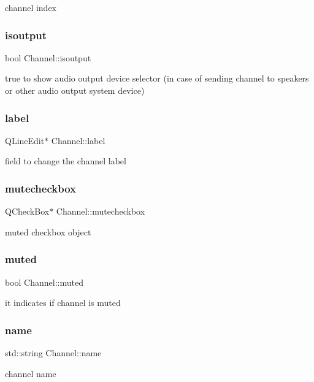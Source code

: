channel index \mbox{\label{class_channel_a01aee8d0f6f9b56328f6a061b4a5a44b}} 
\subsubsection{isoutput}
{\footnotesize\ttfamily bool Channel\+::isoutput\hspace{0.3cm}{\ttfamily [private]}}

true to show audio output device selector (in case of sending channel to speakers or other audio output system device) \mbox{\label{class_channel_a66a7e30d0b8c6ee9c0b0d537b59bd695}} 
\subsubsection{label}
{\footnotesize\ttfamily Q\+Line\+Edit$\ast$ Channel\+::label}

field to change the channel label \mbox{\label{class_channel_a0e7f90da49f291a7bac498e11e886fbd}} 
\subsubsection{mutecheckbox}
{\footnotesize\ttfamily Q\+Check\+Box$\ast$ Channel\+::mutecheckbox}

muted checkbox object \mbox{\label{class_channel_ada7e3a050c346ad283ad302745f03f3c}} 
\subsubsection{muted}
{\footnotesize\ttfamily bool Channel\+::muted}

it indicates if channel is muted \mbox{\label{class_channel_ae080e1afd52f3b70e04c62fea46447aa}} 
\subsubsection{name}
{\footnotesize\ttfamily std\+::string Channel\+::name}

channel name \mbox{\label{class_channel_ac13acc069e61428aca057f9c84bc7338}} 
